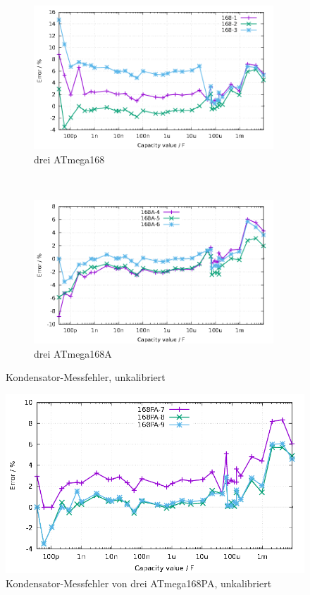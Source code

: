 \begin{figure}[H]
  \begin{subfigure}[b]{9cm}
    \centering
    \includegraphics[width=9cm]{../GNU/Mega168all.pdf}
    \caption{drei ATmega168}
    \label{fig:mega168all}
  \end{subfigure}
  ~
  \begin{subfigure}[b]{9cm}
    \centering
    \includegraphics[width=9cm]{../GNU/Mega168Aall.pdf}
    \caption{drei ATmega168A}
    \label{fig:mega168Aall}
  \end{subfigure}
  \caption{Kondensator-Messfehler, unkalibriert}
\end{figure}

\begin{figure}[H]
\centering
\includegraphics[width=16cm]{../GNU/Mega168PAall.pdf}
\caption{Kondensator-Messfehler von drei ATmega168PA, unkalibriert}
\label{fig:mega168PAall}
\end{figure}

